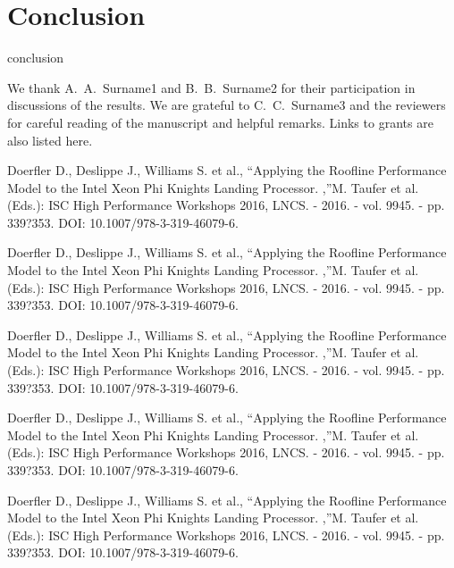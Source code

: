 \documentclass[
11pt,%
tightenlines,%
twoside,%
onecolumn,%
nofloats,%
nobibnotes,%
nofootinbib,%
superscriptaddress,%
noshowpacs,%
centertags]%
{revtex4}
\begin{document}
\section{Conclusion}

conclusion

\begin{acknowledgments}
We thank A.~A.~Surname1 and B.~B.~Surname2 for their participation in discussions of the results. We are grateful to C.~C.~Surname3 and the reviewers for careful reading of the manuscript and helpful remarks. Links to grants are also listed here.
\end{acknowledgments}

\begin{thebibliography}{99}

Doerfler D., Deslippe J., Williams S. et al., \textquotedblleft Applying the Roofline Performance Model to the Intel Xeon Phi Knights Landing Processor. ,\textquotedblright M. Taufer et al. (Eds.): ISC High Performance Workshops 2016, LNCS. - 2016. - vol. 9945. - pp. 339?353. DOI: 10.1007/978-3-319-46079-6.

Doerfler D., Deslippe J., Williams S. et al., \textquotedblleft Applying the Roofline Performance Model to the Intel Xeon Phi Knights Landing Processor. ,\textquotedblright M. Taufer et al. (Eds.): ISC High Performance Workshops 2016, LNCS. - 2016. - vol. 9945. - pp. 339?353. DOI: 10.1007/978-3-319-46079-6.

Doerfler D., Deslippe J., Williams S. et al., \textquotedblleft Applying the Roofline Performance Model to the Intel Xeon Phi Knights Landing Processor. ,\textquotedblright M. Taufer et al. (Eds.): ISC High Performance Workshops 2016, LNCS. - 2016. - vol. 9945. - pp. 339?353. DOI: 10.1007/978-3-319-46079-6.

Doerfler D., Deslippe J., Williams S. et al., \textquotedblleft Applying the Roofline Performance Model to the Intel Xeon Phi Knights Landing Processor. ,\textquotedblright M. Taufer et al. (Eds.): ISC High Performance Workshops 2016, LNCS. - 2016. - vol. 9945. - pp. 339?353. DOI: 10.1007/978-3-319-46079-6.

Doerfler D., Deslippe J., Williams S. et al., \textquotedblleft Applying the Roofline Performance Model to the Intel Xeon Phi Knights Landing Processor. ,\textquotedblright M. Taufer et al. (Eds.): ISC High Performance Workshops 2016, LNCS. - 2016. - vol. 9945. - pp. 339?353. DOI: 10.1007/978-3-319-46079-6.


\end{thebibliography}
\end{document}
